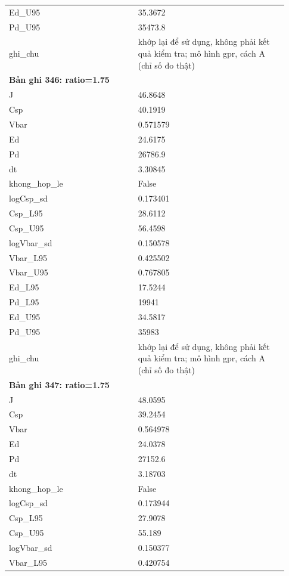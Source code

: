 \begin{longtable}{p{0.43\linewidth}p{0.50\linewidth}}
Ed\_\allowbreak U95 & 35.3672 \\
Pd\_\allowbreak U95 & 35473.8 \\
ghi\_\allowbreak chu & khớp lại để sử dụng, không phải kết quả kiểm tra; mô hình gpr, cách A (chỉ số đo thật) \\
\midrule
\multicolumn{2}{p{0.95\linewidth}}{\textbf{Bản ghi 346: ratio=1.75}} \\
J & 46.8648 \\
Csp & 40.1919 \\
Vbar & 0.571579 \\
Ed & 24.6175 \\
Pd & 26786.9 \\
dt & 3.30845 \\
khong\_\allowbreak hop\_\allowbreak le & False \\
logCsp\_\allowbreak sd & 0.173401 \\
Csp\_\allowbreak L95 & 28.6112 \\
Csp\_\allowbreak U95 & 56.4598 \\
logVbar\_\allowbreak sd & 0.150578 \\
Vbar\_\allowbreak L95 & 0.425502 \\
Vbar\_\allowbreak U95 & 0.767805 \\
Ed\_\allowbreak L95 & 17.5244 \\
Pd\_\allowbreak L95 & 19941 \\
Ed\_\allowbreak U95 & 34.5817 \\
Pd\_\allowbreak U95 & 35983 \\
ghi\_\allowbreak chu & khớp lại để sử dụng, không phải kết quả kiểm tra; mô hình gpr, cách A (chỉ số đo thật) \\
\midrule
\multicolumn{2}{p{0.95\linewidth}}{\textbf{Bản ghi 347: ratio=1.75}} \\
J & 48.0595 \\
Csp & 39.2454 \\
Vbar & 0.564978 \\
Ed & 24.0378 \\
Pd & 27152.6 \\
dt & 3.18703 \\
khong\_\allowbreak hop\_\allowbreak le & False \\
logCsp\_\allowbreak sd & 0.173944 \\
Csp\_\allowbreak L95 & 27.9078 \\
Csp\_\allowbreak U95 & 55.189 \\
logVbar\_\allowbreak sd & 0.150377 \\
Vbar\_\allowbreak L95 & 0.420754 \\

\end{longtable}
